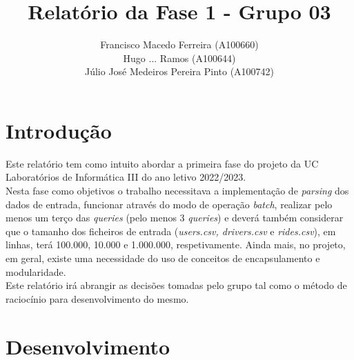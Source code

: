 \documentclass{article}
\title{Relatório da Fase 1 - Grupo 03}
\author{Francisco Macedo Ferreira (A100660)\\Hugo ... Ramos (A100644)\\Júlio José Medeiros Pereira Pinto (A100742)}
\begin{document}
    \maketitle

    \section{Introdução}

    Este relatório tem como intuito abordar a primeira fase do projeto da UC Laboratórios 
    de Informática III do ano letivo 2022/2023.\\
    Nesta fase como objetivos o trabalho necessitava a implementação de \emph{parsing} dos
    dados de entrada, funcionar através do modo de operação \emph{batch}, realizar pelo menos um terço das \emph{queries} (pelo menos 3 \emph{queries}) e deverá também considerar que o tamanho dos ficheiros de entrada (\emph{users.csv, drivers.csv} e \emph{rides.csv}), em linhas, terá 100.000, 10.000 e 1.000.000, respetivamente.
    Ainda mais, no projeto, em geral, existe uma necessidade do uso de conceitos de encapsulamento e modularidade.
    \\Este relatório irá abrangir as decisões tomadas pelo grupo tal como o método de raciocínio para desenvolvimento do mesmo.
    

    \section{Desenvolvimento}
\end{document}
